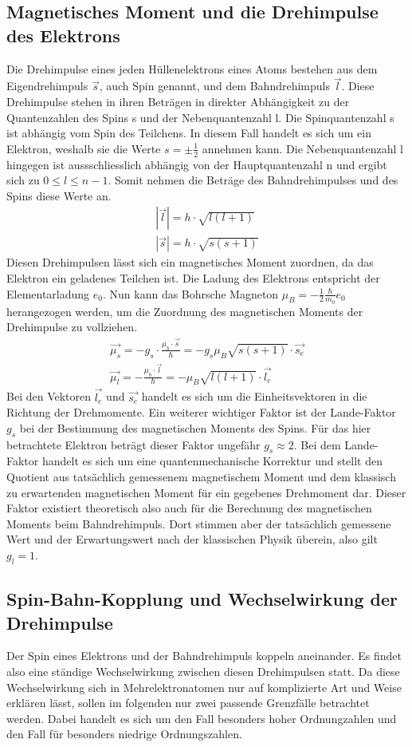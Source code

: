 \subsection{Magnetisches Moment und die Drehimpulse des Elektrons}
Die Drehimpulse eines jeden Hüllenelektrons eines Atoms bestehen aus dem Eigendrehimpuls $\vec{s}$, auch Spin genannt, und dem Bahndrehimpuls $\vec{l}$. Diese Drehimpulse stehen in ihren Beträgen in direkter Abhängigkeit zu der Quantenzahlen des Spins s und der Nebenquantenzahl l. Die Spinquantenzahl s ist abhängig vom Spin des Teilchens. In diesem Fall handelt es sich um ein Elektron, weshalb sie die Werte $s=\pm \frac{1}{2}$ annehmen kann. \linebreak
Die Nebenquantenzahl l hingegen ist aussschliesslich abhängig von der Hauptquantenzahl n und ergibt sich zu $0\leq l\leq n-1$. Somit nehmen die Beträge des Bahndrehimpulses und des Spins diese Werte an.
\begin{align}
    |\vec{l}|=h\cdot\sqrt{l(l+1)}\\
    |\vec{s}|=h\cdot\sqrt{s(s+1)}
\end{align}
Diesen Drehimpulsen lässt sich ein magnetisches Moment zuordnen, da das Elektron ein geladenes Teilchen ist. Die Ladung des Elektrons entspricht der Elementarladung $e_0$. Nun kann das Bohrsche Magneton $\mu_B = -\frac{1}{2}\frac{\hbar}{m_0}e_0$ herangezogen werden, um die Zuordnung des magnetischen Moments der Drehimpulse zu vollziehen.
\begin{align}
    &\vec{\mu_s}=-g_s\cdot\frac{\mu_b\cdot \vec{s}}{\hbar}=-g_s\mu_B\sqrt{s(s+1)}\cdot\vec{s_e}&\\
   & \vec{\mu_l}=-\frac{\mu_b\cdot \vec{l}}{\hbar}=-\mu_B\sqrt{l(l+1)}\cdot\vec{l_e}&
\end{align}
Bei den Vektoren $\vec{l_e}$ und $\vec{s_e}$ handelt es sich um die Einheitsvektoren in die Richtung der Drehmomente. Ein weiterer wichtiger Faktor ist der Lande-Faktor $g_s$ bei der Bestimmung des magnetischen Moments des Spins. Für das hier betrachtete Elektron beträgt dieser Faktor ungefähr $g_s\approx 2$. Bei dem Lande-Faktor handelt es sich um eine quantenmechanische Korrektur und stellt den Quotient aus tatsächlich gemessenem magnetischem Moment und dem klassisch zu erwartenden magnetischen Moment für ein gegebenes Drehmoment dar. Dieser Faktor existiert theoretisch also auch für die Berechnung des magnetischen Moments beim Bahndrehimpuls. Dort stimmen aber der tatsächlich gemessene Wert und der Erwartungswert nach der klassischen Physik überein, also gilt $g_l=1$. 
\subsection{Spin-Bahn-Kopplung und Wechselwirkung der Drehimpulse}
Der Spin eines Elektrons und der Bahndrehimpuls koppeln aneinander. Es findet also eine ständige Wechselwirkung zwischen diesen Drehimpulsen statt. Da diese Wechselwirkung sich in Mehrelektronatomen nur auf komplizierte Art und Weise erklären lässt, sollen im folgenden nur zwei passende Grenzfälle betrachtet werden. Dabei handelt es sich um den Fall besonders hoher Ordnungzahlen und den Fall für besonders niedrige Ordnungszahlen.
